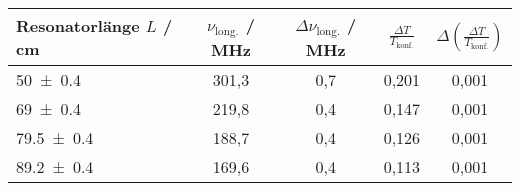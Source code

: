 \begin{tabular}{@{}lcccc@{}}
\toprule
Resonatorlänge $L$ / \si{\centi\metre}& $\nu_\text{long.}$ / \si{\mega\hertz} &$\Delta\nu_\text{long.}$ / \si{\mega\hertz} & $\frac{\Delta T}{T_\text{konf.}}$ & $\Delta\left(\frac{\Delta T}{T_\text{konf.}}\right)$ \\ \midrule
\num{50+-0.4}			              & 301,3 & 0,7 & 0,201 & 0,001 \\
\num{69+-0.4}                         & 219,8 & 0,4 & 0,147 & 0,001 \\
\num{79.5+-0.4}                       & 188,7 & 0,4 & 0,126 & 0,001 \\
\num{89.2+-0.4}                       & 169,6 & 0,4 & 0,113 & 0,001 \\ \bottomrule
\end{tabular}